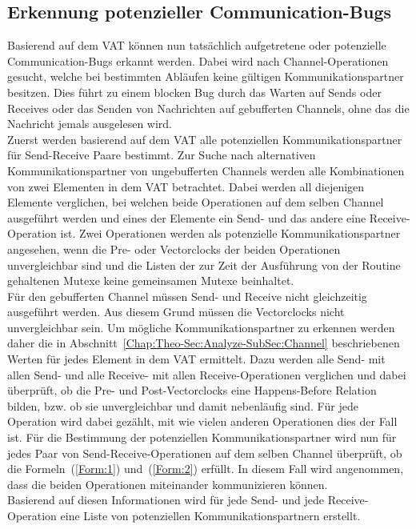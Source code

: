 \subsection{Erkennung potenzieller Communication-Bugs}
Basierend auf dem VAT können nun tatsächlich aufgetretene oder potenzielle 
Communication-Bugs erkannt werden. Dabei wird nach Channel-Operationen 
gesucht, welche bei bestimmten Abläufen keine gültigen Kommunikationspartner
besitzen. Dies führt zu einem blocken Bug durch das Warten auf 
Sends oder Receives oder das Senden von Nachrichten auf gebufferten 
Channels, ohne das die Nachricht jemals ausgelesen wird.\\  
Zuerst werden basierend auf dem VAT alle potenziellen Kommunikationspartner 
für Send-Receive Paare bestimmt.
Zur Suche nach alternativen Kommunikationspartner von ungebufferten Channels
werden alle Kombinationen
von zwei Elementen in dem VAT betrachtet. Dabei werden all diejenigen 
Elemente verglichen, bei welchen beide Operationen auf dem selben Channel 
ausgeführt werden und eines der 
Elemente ein Send- und das andere eine Receive-Operation ist. Zwei Operationen
werden als potenzielle Kommunikationspartner angesehen, wenn die Pre- oder
Vectorclocks der beiden 
Operationen unvergleichbar sind und die Listen der zur Zeit der 
Ausführung von der Routine gehaltenen Mutexe keine gemeinsamen Mutexe beinhaltet.\\
Für den gebufferten Channel müssen Send- und Receive nicht 
gleichzeitig ausgeführt werden. Aus diesem Grund müssen die Vectorclocks 
nicht unvergleichbar sein. Um mögliche Kommunikationspartner zu erkennen 
werden daher 
die in Abschnitt~\ref{Chap:Theo-Sec:Analyze-SubSec:Channel} beschriebenen 
Werten für jedes Element in dem VAT ermittelt. Dazu werden alle Send- mit allen 
Send- und alle Receive- mit allen Receive-Operationen verglichen 
und dabei überprüft, ob die Pre- und Post-Vectorclocks eine Happens-Before 
Relation bilden, bzw. ob sie unvergleichbar und damit nebenläufig sind. 
Für jede Operation wird dabei gezählt, mit wie vielen anderen Operationen 
dies der Fall ist.
Für die Bestimmung der potenziellen Kommunikationspartner wird nun 
für jedes Paar von Send-Receive-Operationen auf dem selben Channel 
überprüft, 
ob die Formeln~(\ref{Form:1}) und~(\ref{Form:2}) 
erfüllt. In diesem Fall wird angenommen, dass die beiden Operationen
miteinander kommunizieren können.\\
Basierend auf diesen Informationen wird für jede Send- und jede Receive-Operation
eine Liste von potenziellen Kommunikationspartnern erstellt.\\
